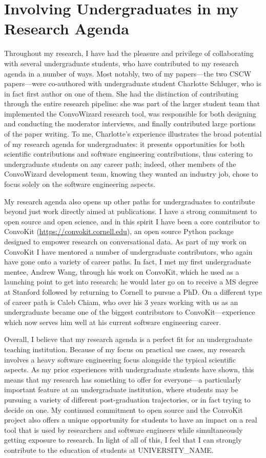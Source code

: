 \documentclass[11pt,letterpaper]{article}
\begin{document}
\section{Involving Undergraduates in my Research Agenda}
Throughout my research, I have had the pleasure and privilege of collaborating with several undergraduate students, who have contributed to my research agenda in a number of ways.
Most notably, two of my papers---the two CSCW papers---were co-authored with undergraduate student Charlotte Schluger, who is in fact first author on one of them.
She had the distinction of contributing through the entire research pipeline: she was part of the larger student team that implemented the ConvoWizard research tool, was responsible for both designing and conducting the moderator interviews, and finally contributed large portions of the paper writing.
To me, Charlotte's experience illustrates the broad potential of my research agenda for undergraduates: it presents opportunities for both scientific contributions and software engineering contributions, thus catering to undergraduate students on any career path; indeed, other members of the ConvoWizard development team, knowing they wanted an industry job, chose to focus solely on the software engineering aspects.

My research agenda also opens up other paths for undergraduates to contribute beyond just work directly aimed at publications.
I have a strong commitment to open source and open science, and in this spirit I have been a core contributor to ConvoKit (\url{https://convokit.cornell.edu}), an open source Python package designed to empower research on conversational data.
As part of my work on ConvoKit I have mentored a number of undergraduate contributors, who again have gone onto a variety of career paths.
In fact, I met my first undergraduate mentee, Andrew Wang, through his work on ConvoKit, which he used as a launching point to get into research; he would later go on to receive a MS degree at Stanford followed by returning to Cornell to pursue a PhD.
On a different type of career path is Caleb Chiam, who over his 3 years working with us as an undergraduate became one of the biggest contributors to ConvoKit---experience which now serves him well at his current software engineering career.

Overall, I believe that my research agenda is a perfect fit for an undergraduate teaching institution.
Because of my focus on practical use cases, my research involves a heavy software engineering focus alongside the typical scientific aspects.
As my prior experiences with undergraduate students have shown, this means that my research has something to offer for everyone---a particularly important feature at an undergraduate institution, where students may be pursuing a variety of different post-graduation trajectories, or in fact trying to decide on one.
My continued commitment to open source and the ConvoKit project also offers a unique opportunity for students to have an impact on a real tool that is used by researchers and software engineers while simultaneously getting exposure to research.
In light of all of this, I feel that I can strongly contribute to the education of students at UNIVERSITY\_NAME.

\vspace{\baselineskip}


\end{document}
